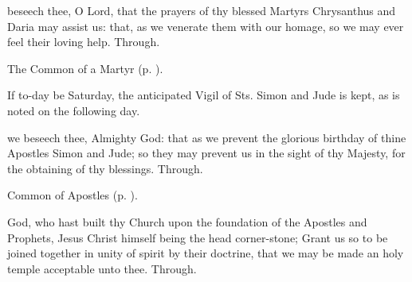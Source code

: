 \memorialCollect
{} beseech thee, O Lord, that the prayers of thy blessed Martyrs Chrysanthus and Daria may assist us: that, as we venerate them with our homage, so we may ever feel their loving help. Through.


\clearpage
{}

\begin{rubric}
	The Common of a Martyr (p. \pageref{CommonMartyrBishopCollect}).
\end{rubric}

\begin{rubric}
	If to-day be Saturday, the anticipated Vigil of Sts. Simon and Jude is kept, as is noted on the following day.
\end{rubric}



{} we beseech thee, Almighty God: that as we prevent the glorious birthday of thine Apostles Simon and Jude; so they may prevent us in the sight of thy Majesty, for the obtaining of thy blessings. Through.



\begin{rubric}
	Common of Apostles (p. \pageref{CommonApostles}).
\end{rubric}

{} God, who hast built thy Church upon the foundation of the Apostles and Prophets, Jesus Christ himself being the head corner-stone; Grant us so to be joined together in unity of spirit by their doctrine, that we may be made an holy temple acceptable unto thee. Through.


\fancyhead[RE,LO]{}

